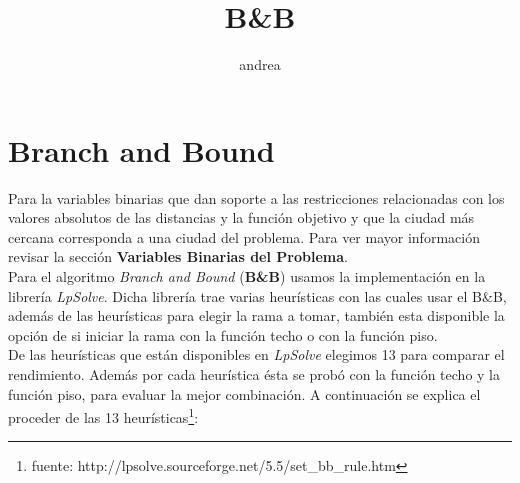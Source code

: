 \documentclass[a4paper,10pt]{article}
\title{B\&B}
\author{andrea}
\begin{document}
\maketitle

\section{Branch and Bound}

Para la variables binarias que dan soporte a las restricciones relacionadas con los valores absolutos de las distancias y la función objetivo y que la ciudad más cercana corresponda
a una ciudad del problema. Para ver mayor información revisar la sección \textbf{Variables Binarias del Problema}.\\

Para el algoritmo \emph{Branch and Bound} (\textbf{B\&B}) usamos la implementación en la librería \emph{LpSolve}. Dicha librería trae varias heurísticas con las cuales usar
el B\&B, además de las heurísticas para elegir la rama a tomar, también esta disponible la opción de si iniciar la rama con la función techo o con la función piso.\\

De las heurísticas que están disponibles en \emph{LpSolve} elegimos 13 para comparar el rendimiento. Además por cada heurística ésta se probó con la función techo y la función piso, para 
evaluar la mejor combinación. A continuación se explica el proceder de las 13 heurísticas\footnote{fuente: http://lpsolve.sourceforge.net/5.5/set\_bb\_rule.htm}:
\end{document}
